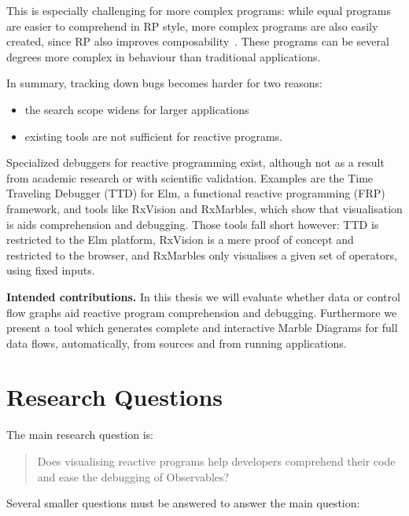This is especially challenging for more complex programs:  while equal
programs are easier to comprehend in RP style, more complex programs are
also easily created, since RP also improves composability~\cite{maier2012deprecating}.
These programs can be several degrees more complex in behaviour than
traditional applications.

In summary, tracking down bugs becomes harder for two reasons:

\begin{itemize}
    \item
        the search scope widens for larger applications
    \item
        existing tools are not sufficient for reactive programs.

\end{itemize}

Specialized debuggers for reactive programming exist, although not as a
result from academic research or with scientific validation.  Examples
are the Time Traveling Debugger (TTD) for Elm, a functional reactive
programming (FRP) framework, and tools like RxVision and RxMarbles,
which show that visualisation is aids comprehension and debugging. Those
tools fall short however:  TTD is restricted to the Elm platform,
RxVision is a mere proof of concept and restricted to the browser, and
RxMarbles only visualises a given set of operators, using fixed inputs.

\textbf{Intended contributions.} In this thesis we will evaluate whether
data or control flow graphs aid reactive program comprehension and
debugging.  Furthermore we present a tool which generates complete and
interactive Marble Diagrams for full data flows, automatically, from
sources and from running applications.

\section{Research Questions}%
\label{sec:questions} The main research question is:

\begin{quotation}
    \noindent
    Does visualising reactive programs help developers comprehend their
    code and ease the debugging of Observables?
\end{quotation}

\noindent
Several smaller questions must be answered to answer the main question:

